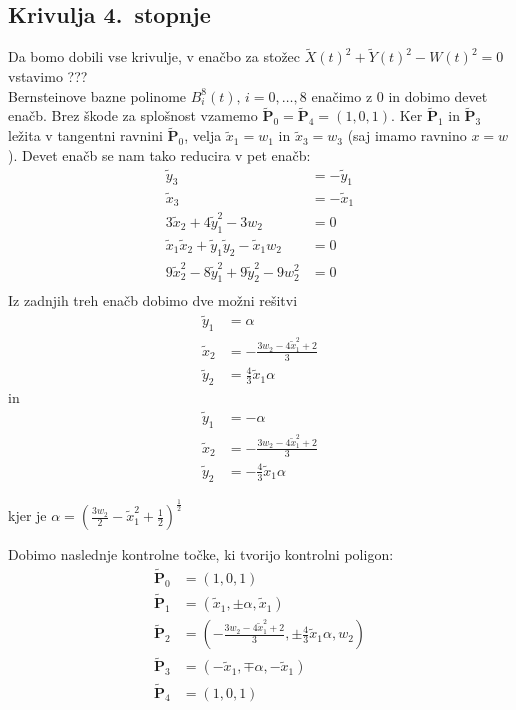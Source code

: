 \documentclass[a4paper,11pt]{article}
\theoremstyle{definition}
\theoremstyle{plain}
\begin{document}
\subsection{Krivulja 4.~stopnje}
Da bomo dobili vse krivulje, v enačbo za stožec $\tilde{X}(t)^2+\tilde{Y}(t)^2-W(t)^2=0$ vstavimo ??? \\
Bernsteinove bazne polinome $B_i^8(t),\,i=0,\ldots,8$ enačimo z $0$ in dobimo devet enačb.
Brez škode za splošnost vzamemo $\boldsymbol{\tilde{P}}_0 =\boldsymbol{\tilde{P}}_4 = (1,0,1)$. Ker $\boldsymbol{\tilde{P}}_1$ in $\boldsymbol{\tilde{P}}_3$ ležita v tangentni ravnini $\boldsymbol{\tilde{P}}_0$, velja $\tilde{x}_1=w_1$ in $\tilde{x}_3=w_3$ (saj imamo ravnino $x=w$). Devet enačb se nam tako reducira v pet enačb:
\begin{align*}
\tilde{y}_3 &=- \tilde{y}_1 \\
\tilde{x}_3 &= - \tilde{x}_1 \\
3\tilde{x}_2 + 4\tilde{y}_1^2 - 3w_2 &= 0 \\
\tilde{x}_1\tilde{x}_2 + \tilde{y}_1\tilde{y}_2  - \tilde{x}_1w_2 &= 0 \\
9\tilde{x}_2^2 - 8\tilde{y}_1^2 + 9\tilde{y}_2^2 - 9w_2^2&= 0 \\
\end{align*}
Iz zadnjih treh enačb dobimo dve možni rešitvi
\begin{align*}
\tilde{y}_1 &= \alpha \\
\tilde{x}_2 &=-\frac{3w_2-4\tilde{x}_1^2+2}{3}\\
\tilde{y}_2 &= \frac{4}{3}\tilde{x}_1\alpha
\end{align*}
in
\begin{align*}
\tilde{y}_1 &= -\alpha \\
\tilde{x}_2 &=-\frac{3w_2-4\tilde{x}_1^2+2}{3}\\
\tilde{y}_2 &= -\frac{4}{3}\tilde{x}_1\alpha
\end{align*}

kjer je $\alpha=(\frac{3w_2}{2}-\tilde{x}_1^2+\frac{1}{2})^{\frac{1}{2}}$

Dobimo naslednje kontrolne točke, ki tvorijo kontrolni poligon:
\begin{align*}
\boldsymbol{\tilde{P}}_0 &= (1,0,1) \\
\boldsymbol{\tilde{P}}_1 &= (\tilde{x}_1,\pm\alpha,\tilde{x}_1) \\
\boldsymbol{\tilde{P}}_2 &= (-\frac{3w_2-4\tilde{x}_1^2+2}{3},\pm\frac{4}{3}\tilde{x}_1\alpha,w_2) \\
\boldsymbol{\tilde{P}}_3 &= (-\tilde{x}_1,\mp\alpha,-\tilde{x}_1) \\
\boldsymbol{\tilde{P}}_4 &= (1,0,1)
\end{align*}
\end{document}
